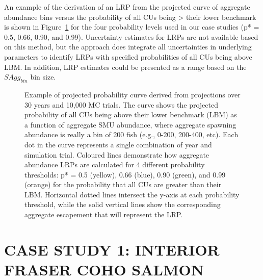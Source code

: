 \documentclass[11pt]{book}
\begin{document}
An example of the derivation of an LRP from the projected curve of aggregate abundance bins versus the probability of all CUs being \textgreater{} their lower benchmark is shown in Figure~\ref{fig:example-projectedCurve} for the four probability levels used in our case studies (p* = 0.5, 0.66, 0.90, and 0.99). Uncertainty estimates for LRPs are not available based on this method, but the approach does integrate all uncertainties in underlying parameters to identify LRPs with specified probabilities of all CUs being above LBM. In addition, LRP estimates could be presented as a range based on the \(SAgg_{bin}\) bin size.
\begin{figure}[htb]

{\centering {} 

}

\caption{Example of projected probability curve derived from projections over 30 years and 10,000 MC trials.  The curve shows the projected probability of all CUs being above their lower benchmark (LBM) as a function of aggregate SMU abundance, where aggregate spawning abundance is really a bin of 200 fish (e.g., 0-200, 200-400, etc). Each dot in the curve represents a single combination of year and simulation trial. Coloured lines demonstrate how aggregate abundance LRPs are calculated for 4 different probability thresholds: p* = 0.5 (yellow), 0.66 (blue), 0.90 (green), and 0.99 (orange) for the probability that all CUs are greater than their LBM. Horizontal dotted lines intersect the y-axis at each probability threshold, while the solid vertical lines show the corresponding aggregate escapement that will represent the LRP.}\label{fig:example-projectedCurve}
\end{figure}
\hypertarget{IFCChapter}{%
\section{CASE STUDY 1: INTERIOR FRASER COHO SALMON}\label{IFCChapter}}
\end{document}
